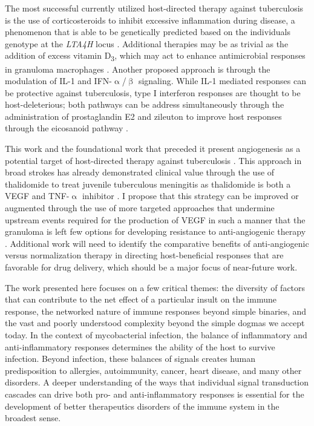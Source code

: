 The most successful currently utilized host\hyp{}directed therapy against tuberculosis is the use of corticosteroids to inhibit excessive inflammation during disease, a phenomenon that is able to be genetically predicted based on the individuals genotype at the \textit{LTA4H} locus \citep{Tobin2012, Tobin2015}. Additional therapies may be as trivial as the addition of excess vitamin D\textsubscript{3}, which may act to enhance antimicrobial responses in granuloma macrophages \citep{Tobin2015}. Another proposed approach is through the modulation of IL\hyp{}1 and IFN\hyp{}$\upalpha$/$\upbeta$ signaling. While IL\hyp{}1 mediated responses can be protective against tuberculosis, type I interferon responses are thought to be host\hyp{}deleterious; both pathways can be address simultaneously through the administration of prostaglandin E2 and zileuton to improve host responses through the eicosanoid pathway \citep{MayerBarber2014, Kaufmann2014}.

This work and the foundational work that preceded it present angiogenesis as a potential target of host\hyp{}directed therapy against tuberculosis \citep{Oehlers2015, Datta2015, Oehlers2017, Polena2016, Walton2018}. This approach in broad strokes has already demonstrated clinical value through the use of thalidomide to treat juvenile tuberculous meningitis as thalidomide is both a VEGF and TNF\hyp{}$\upalpha$ inhibitor \citep{Kaufmann2014, vanToorn2021}. I propose that this strategy can be improved or augmented through the use of more targeted approaches that undermine upstream events required for the production of VEGF in such a manner that the granuloma is left few options for developing resistance to anti\hyp{}angiogenic therapy \citep{Kiran2016}. Additional work will need to identify the comparative benefits of anti\hyp{}angiogenic versus normalization therapy in directing host\hyp{}beneficial responses that are favorable for drug delivery, which should be a major focus of near\hyp{}future work.

The work presented here focuses on a few critical themes: the diversity of factors that can contribute to the net effect of a particular insult on the immune response, the networked nature of immune responses beyond simple binaries, and the vast and poorly understood complexity beyond the simple dogmas we accept today. In the context of mycobacterial infection, the balance of inflammatory and anti\hyp{}inflammatory responses determines the ability of the host to survive infection. Beyond infection, these balances of signals creates human predisposition to allergies, autoimmunity, cancer, heart disease, and many other disorders. A deeper understanding of the ways that individual signal transduction cascades can drive both pro\hyp{} and anti\hyp{}inflammatory responses is essential for the development of better therapeutics disorders of the immune system in the broadest sense.

